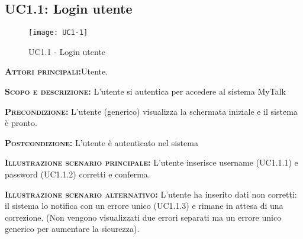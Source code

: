 \subsection{UC1.1: Login utente}
\begin{figure}[H]
\begin{center}
\texttt{[image: UC1-1]}
\caption{UC1.1 - Login utente}\label{fig:login}
\end{center}
\end{figure}
\begin{description}
\item{\scshape\bfseries Attori principali:}Utente.
\item{\scshape\bfseries Scopo e descrizione:} L'utente si autentica per accedere al sistema MyTalk
\item{\scshape\bfseries Precondizione:} L'utente (generico) visualizza la schermata iniziale e il sistema è pronto.
\item{\scshape\bfseries Postcondizione:} L'utente è autenticato nel sistema
\item{\scshape\bfseries Illustrazione scenario principale:} L'utente inserisce username (UC1.1.1) e password (UC1.1.2) corretti e conferma.
\item{\scshape\bfseries Illustrazione scenario alternativo:} L'utente ha inserito dati non corretti: il sistema lo notifica con un errore unico (UC1.1.3) e rimane in attesa di una correzione. (Non vengono visualizzati due errori separati ma un errore unico generico per aumentare la sicurezza).
\end{description}

